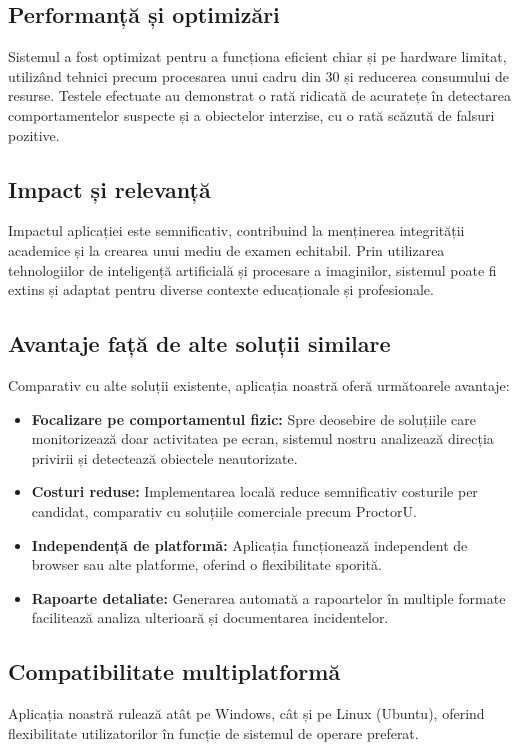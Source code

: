 \documentclass[12pt,a4paper]{article}
\begin{document}
\subsection{Performanță și optimizări}

Sistemul a fost optimizat pentru a funcționa eficient chiar și pe hardware limitat, utilizând tehnici precum procesarea unui cadru din 30 și reducerea consumului de resurse. Testele efectuate au demonstrat o rată ridicată de acuratețe în detectarea comportamentelor suspecte și a obiectelor interzise, cu o rată scăzută de falsuri pozitive.

\subsection{Impact și relevanță}

Impactul aplicației este semnificativ, contribuind la menținerea integrității academice și la crearea unui mediu de examen echitabil. Prin utilizarea tehnologiilor de inteligență artificială și procesare a imaginilor, sistemul poate fi extins și adaptat pentru diverse contexte educaționale și profesionale.

\subsection{Avantaje față de alte soluții similare}

Comparativ cu alte soluții existente, aplicația noastră oferă următoarele avantaje:
\begin{itemize}
    \item \textbf{Focalizare pe comportamentul fizic:} Spre deosebire de soluțiile care monitorizează doar activitatea pe ecran, sistemul nostru analizează direcția privirii și detectează obiectele neautorizate.
    \item \textbf{Costuri reduse:} Implementarea locală reduce semnificativ costurile per candidat, comparativ cu soluțiile comerciale precum ProctorU.
    \item \textbf{Independență de platformă:} Aplicația funcționează independent de browser sau alte platforme, oferind o flexibilitate sporită.
    \item \textbf{Rapoarte detaliate:} Generarea automată a rapoartelor în multiple formate facilitează analiza ulterioară și documentarea incidentelor.
\end{itemize}

\subsection{Compatibilitate multiplatformă}
Aplicația noastră rulează atât pe Windows, cât și pe Linux (Ubuntu), oferind flexibilitate utilizatorilor în funcție de sistemul de operare preferat. 
\end{document}
